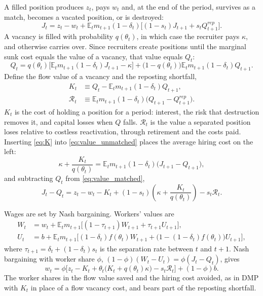 \documentclass[authoryear, review, 12pt]{elsarticle}
\newcommand{\E}{\mathbb{E}}
\begin{document}
A filled position produces $z_t$, pays $w_t$ and, at the end of the period, survives as a match, becomes a vacated position, or is destroyed:
\begin{equation}\label{eq:value_matched}
J_t = z_t - w_t + \E_t m_{t+1}(1-\delta_t)\big[(1-s_t)J_{t+1}+s_tQ_{t+1}^{rep}\big].
\end{equation}
A vacancy is filled with probability $q(\theta_t)$, in which case the recruiter pays $\kappa$, and otherwise carries over. Since recruiters create positions until the marginal sunk cost equals the value of a vacancy, that value equals $Q_t$:
\begin{equation}\label{eq:value_unmatched}
Q_t = q(\theta_t)\big[\E_tm_{t+1}(1-\delta_t)J_{t+1}-\kappa\big] + \big(1-q(\theta_t)\big)\E_tm_{t+1}(1-\delta_t)Q_{t+1}.
\end{equation}
Define the flow value of a vacancy and the reposting shortfall,
\begin{align}
K_t &\equiv Q_t - \E_tm_{t+1}(1-\delta_t)Q_{t+1}, \label{eq:K}\\
\mathcal{R}_t &\equiv \E_tm_{t+1}(1-\delta_t)\big(Q_{t+1}-Q_{t+1}^{rep}\big). \label{eq:repost_shortfall}
\end{align}
$K_t$ is the cost of holding a position for a period: interest, the risk that destruction removes it, and capital losses when $Q$ falls. $\mathcal{R}_t$ is the value a separated position loses relative to costless reactivation, through retirement and the costs paid. Inserting \eqref{eq:K} into \eqref{eq:value_unmatched} places the average hiring cost on the left:
\begin{equation}\label{eq:average_hiring_cost}
\kappa+\frac{K_t}{q(\theta_t)} = \E_tm_{t+1}(1-\delta_t)\big(J_{t+1}-Q_{t+1}\big),
\end{equation}
and subtracting $Q_t$ from \eqref{eq:value_matched},
\begin{equation}\label{eq:value_surplus}
J_t-Q_t = z_t - w_t - K_t + (1-s_t)\left(\kappa+\frac{K_t}{q(\theta_t)}\right) - s_t\mathcal{R}_t.
\end{equation}

Wages are set by Nash bargaining. Workers' values are
\begin{align}
W_t &= w_t + \E_tm_{t+1}\big[(1-\tau_{t+1})W_{t+1}+\tau_{t+1}U_{t+1}\big],\\
U_t &= b + \E_tm_{t+1}\big[(1-\delta_t)f(\theta_t)W_{t+1}+\big(1-(1-\delta_t)f(\theta_t)\big)U_{t+1}\big],
\end{align}
where $\tau_{t+1}=\delta_t+(1-\delta_t)s_t$ is the separation rate between $t$ and $t+1$. Nash bargaining with worker share $\phi$, $(1-\phi)(W_t-U_t)=\phi(J_t-Q_t)$, gives
\begin{equation}\label{eq:wage}
w_t = \phi\big[z_t - K_t + \theta_t\big(K_t+q(\theta_t)\kappa\big) - s_t\mathcal{R}_t\big] + (1-\phi)b.
\end{equation}
The worker shares in the flow value saved and the hiring cost avoided, as in DMP with $K_t$ in place of a flow vacancy cost, and bears part of the reposting shortfall.
\end{document}

